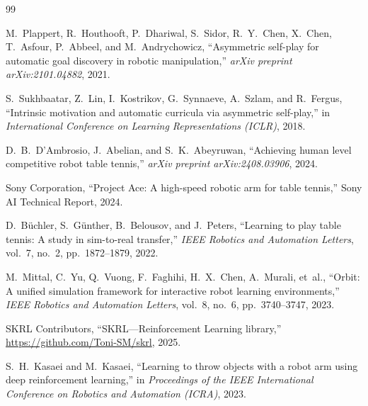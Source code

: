 \documentclass[11pt, a4paper]{article}
\begin{document}

\begin{thebibliography}{99}

M.~Plappert, R.~Houthooft, P.~Dhariwal, S.~Sidor, R.~Y.~Chen, X.~Chen, T.~Asfour, P.~Abbeel, and M.~Andrychowicz,
``Asymmetric self-play for automatic goal discovery in robotic manipulation,''
\textit{arXiv preprint arXiv:2101.04882}, 2021.

S.~Sukhbaatar, Z.~Lin, I.~Kostrikov, G.~Synnaeve, A.~Szlam, and R.~Fergus,
``Intrinsic motivation and automatic curricula via asymmetric self-play,''
in \textit{International Conference on Learning Representations (ICLR)}, 2018.

D.~B.~D'Ambrosio, J.~Abelian, and S.~K.~Abeyruwan,
``Achieving human level competitive robot table tennis,''
\textit{arXiv preprint arXiv:2408.03906}, 2024.

Sony Corporation,
``Project Ace: A high-speed robotic arm for table tennis,''
Sony AI Technical Report, 2024.

D.~B\"{u}chler, S.~G\"{u}nther, B.~Belousov, and J.~Peters,
``Learning to play table tennis: A study in sim-to-real transfer,''
\textit{IEEE Robotics and Automation Letters}, vol.~7, no.~2, pp.~1872--1879, 2022.

M.~Mittal, C.~Yu, Q.~Vuong, F.~Faghihi, H.~X.~Chen, A.~Murali, et~al.,
``Orbit: A unified simulation framework for interactive robot learning environments,''
\textit{IEEE Robotics and Automation Letters}, vol.~8, no.~6, pp.~3740--3747, 2023.

SKRL Contributors,
``SKRL---Reinforcement Learning library,''
\url{https://github.com/Toni-SM/skrl}, 2025.

S.~H.~Kasaei and M.~Kasaei,
``Learning to throw objects with a robot arm using deep reinforcement learning,''
in \textit{Proceedings of the IEEE International Conference on Robotics and Automation (ICRA)}, 2023.

\end{thebibliography}
\end{document}

